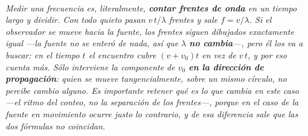 \begin{center}
\\[0.5em]
{\small\itshape Medir una frecuencia es, literalmente, \textbf{contar frentes de
onda} en un tiempo largo y dividir. Con todo quieto pasan $v\,t/\lambda$ frentes
y sale $f = v/\lambda$. Si el observador se mueve hacia la fuente, los frentes
siguen dibujados exactamente igual ---la fuente no se enteró de nada, así que
$\lambda$ \textbf{no cambia}---, pero él los va a buscar: en el tiempo $t$ el
encuentro cubre $(v + v_0)t$ en vez de $v\,t$, y por eso cuenta más. Sólo
interviene la componente de $v_0$ \textbf{en la dirección de propagación}: quien
se mueve tangencialmente, sobre un mismo círculo, no percibe cambio alguno. Es
importante retener qué es lo que cambia en este caso ---el ritmo del conteo, no
la separación de los frentes---, porque en el caso de la fuente en movimiento
ocurre justo lo contrario, y de esa diferencia sale que las dos fórmulas no
coincidan.}
\end{center}
